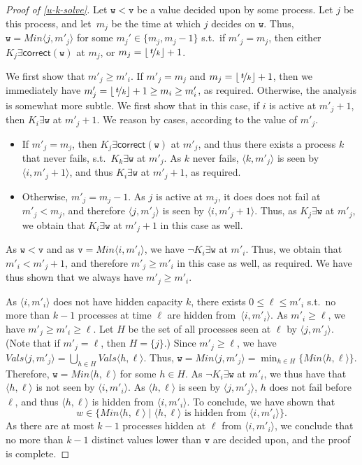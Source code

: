 \documentclass[11pt]{article}
\theoremstyle{definition}
\newcommand{\minval}[1]{\ensuremath{\mathit{Min}\node{#1}}}
\newcommand{\knownvals}[1]{\ensuremath{\mathit{Vals}\node{#1}}}
\newcommand{\set}[1]{\{#1\}}
\newcommand{\defemph}[1]{\textbf{\textit{#1}}}
\newcommand{\tee}{\,\defemph{t}}
\newcommand{\node}[1]{\langle#1\rangle}
\newcommand{\cw}{\exists\mathsf{correct}(\mathtt{w})}
\begin{document}
\begin{proof}[Proof of \cref{u-k-solve}]
Let $\mathtt{w}<\mathtt{v}$ be a value decided upon by some process. Let $j$ be this process, and let~$m_j$ be the time at which $j$ decides on $\mathtt{w}$.
Thus, $\mathtt{w} = \minval{j,m'_j}$ for some $m_j' \in \{m_j,m_j-1\}$ s.t.\ if $m'_j=m_j$, then either $K_j\cw$ at $m_j$, or $m_j=\lfloor\nicefrac{\tee}{k}\rfloor+1$.

We first show that $m'_j \ge m'_i$. If $m'_j=m_j$ and $m_j=\lfloor\nicefrac{\tee}{k}\rfloor+1$, then we immediately have
$m'_j=\lfloor\nicefrac{\tee}{k}\rfloor+1\ge m_i \ge m'_i$, as required. Otherwise, the analysis is somewhat more subtle. We
first show that in this case, if $i$ is active at $m'_j+1$, then $K_i\exists\mathtt{w}$ at $m'_j+1$. We reason by cases, according to the value of $m'_j$.
\begin{itemize}
\item
If $m'_j=m_j$, then $K_j\cw$ at $m'_j$, and thus there exists a process $k$ that never fails,
s.t.\ $K_k\exists\mathtt{w}$ at $m'_j$. As $k$ never fails, $\node{k,m'_j}$ is seen by $\node{i,m'_j+1}$, and thus $K_i\exists\mathtt{w}$ at $m'_j+1$, as required.
\item
Otherwise, $m'_j=m_j-1$. As $j$ is active at $m_j$, it does does not fail at $m'_j<m_j$, and therefore $\node{j,m'_j}$ is seen by
$\node{i,m'_j+1}$. Thus, as $K_j\exists\mathtt{w}$ at $m'_j$, we obtain that $K_i\exists\mathtt{w}$ at $m'_j+1$ in this case as well.
\end{itemize}
As $\mathtt{w}<\mathtt{v}$ and as $\mathtt{v} = \minval{i,m'_i}$, we have $\lnot K_i\exists\mathtt{w}$ at $m'_i$. Thus, we obtain that $m'_i < m'_j+1$, and therefore
$m'_j \ge m'_i$ in this case as well, as required. We have thus shown that we always have $m'_j \ge m'_i$.

As $\node{i,m'_i}$ does not have hidden capacity $k$, there exists $0\le\ell\le m'_i$ s.t.\ no more than $k-1$ processes at time $\ell$ are hidden from~$\node{i,m'_i}$.
As $m'_i \ge \ell$, we have $m'_j \ge m'_i \ge \ell$.
Let $H$ be the set of all processes seen at $\ell$ by $\node{j,m'_j}$. (Note
that if $m'_j = \ell$, then $H = \set{j}$.)
Since $m'_j \ge \ell$,
we have $\knownvals{j,m'_j} = \bigcup_{h \in H} \knownvals{h,\ell}$. Thus, $\mathtt{w}=\minval{j,m'_j}=\min_{h \in H}\{\minval{h,\ell}\}$. Therefore,
$\mathtt{w} = \minval{h,\ell}$ for some $h \in H$. As $\lnot K_i \exists\mathtt{w}$ at $m'_i$, we thus have that $\node{h,\ell}$ is not seen
by $\node{i,m'_i}$. As $\node{h,\ell}$ is seen by $\node{j,m'_j}$, $h$ does not fail
before $\ell$, and thus $\node{h,\ell}$ is hidden from $\node{i,m'_i}$.
To conclude, we have shown that
\[w \in \bigl\{ \minval{h,\ell} \mid
\mbox{$\node{h,\ell}$ is hidden from $\node{i,m'_i}$} \bigr\}.\]
As there are at most $k-1$ processes hidden at $\ell$ from $\node{i,m'_i}$,
we conclude that no more than $k-1$ distinct values lower than $\mathtt{v}$ are
decided upon, and the proof is complete.
\end{proof}
\end{document}
